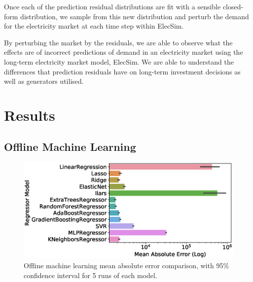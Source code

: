 \documentclass[final,3p,times,twocolumn,numbers]{elsarticle}
\begin{document}
Once each of the prediction residual distributions are fit with a sensible closed-form distribution, we sample from this new distribution and perturb the demand for the electricity market at each time step within ElecSim.

By perturbing the market by the residuals, we are able to observe what the effects are of incorrect predictions of demand in an electricity market using the long-term electricity market model, ElecSim. We are able to understand the differences that prediction residuals have on long-term investment decisions as well as generators utilised.




\section{Results}
\label{sec:results}



\subsection{Offline Machine Learning}


\begin{figure}
\centering
\includegraphics[width=\columnwidth]{figures/results/offline_model_mae.eps}
\caption{Offline machine learning mean absolute error comparison, with 95\% confidence interval for 5 runs of each model.}
\label{fig:beis_elecsim_historic_comparison}
\end{figure}
\end{document}

